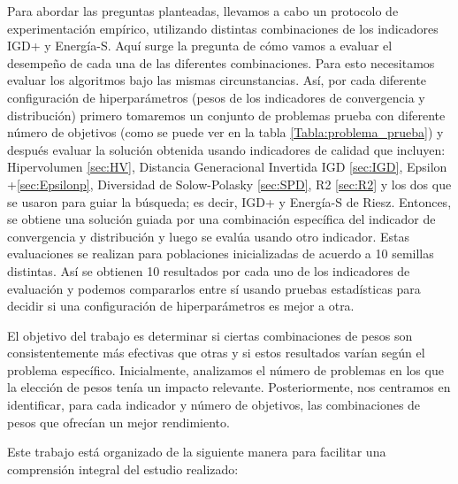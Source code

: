 Para abordar las preguntas planteadas, llevamos a cabo un protocolo de experimentación empírico, utilizando distintas combinaciones de los indicadores IGD+ y Energía-S. Aquí surge la pregunta de cómo vamos a evaluar el desempeño de cada una de las diferentes combinaciones. Para esto necesitamos evaluar los algoritmos bajo las mismas circunstancias. Así, por cada diferente configuración de hiperparámetros (pesos de los indicadores de convergencia y distribución) primero tomaremos un conjunto de problemas prueba con diferente número de objetivos (como se puede ver en la tabla \ref{Tabla:problema_prueba}) y después evaluar la solución obtenida usando indicadores de calidad que incluyen: Hipervolumen \ref{sec:HV}, Distancia Generacional Invertida IGD \ref{sec:IGD}, Epsilon +\ref{sec:Epsilonp}, Diversidad de Solow-Polasky \ref{sec:SPD}, R2 \ref{sec:R2} y los dos que se usaron para guiar la búsqueda; es decir, IGD+ y Energía-S de Riesz. Entonces, se obtiene una solución guiada por una combinación específica del indicador de convergencia y distribución y luego se evalúa usando otro indicador. Estas evaluaciones se realizan para poblaciones inicializadas de acuerdo a 10 semillas distintas. Así se obtienen 10 resultados por cada uno de los indicadores de evaluación y podemos compararlos entre sí usando pruebas estadísticas para decidir si una configuración de hiperparámetros es mejor a otra.

El objetivo del trabajo es determinar si ciertas combinaciones de pesos son consistentemente más efectivas que otras y si estos resultados varían según el problema específico. Inicialmente, analizamos el número de problemas en los que la elección de pesos tenía un impacto relevante. Posteriormente, nos centramos en identificar, para cada indicador y número de objetivos, las combinaciones de pesos que ofrecían un mejor rendimiento.

Este trabajo está organizado de la siguiente manera para facilitar una comprensión integral del estudio realizado:

